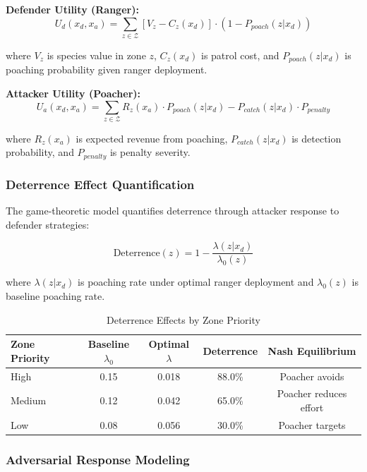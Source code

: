 \textbf{Defender Utility (Ranger):}
\begin{equation}
U_d(x_d, x_a) = \sum_{z \in \mathcal{Z}} \left[ V_z - C_z(x_d) \right] \cdot (1 - P_{poach}(z|x_d))
\label{eq:defender_utility}
\end{equation}

where $V_z$ is species value in zone $z$, $C_z(x_d)$ is patrol cost, and $P_{poach}(z|x_d)$ is poaching probability given ranger deployment.

\textbf{Attacker Utility (Poacher):}
\begin{equation}
U_a(x_d, x_a) = \sum_{z \in \mathcal{Z}} R_z(x_a) \cdot P_{poach}(z|x_d) - P_{catch}(z|x_d) \cdot P_{penalty}
\label{eq:attacker_utility}
\end{equation}

where $R_z(x_a)$ is expected revenue from poaching, $P_{catch}(z|x_d)$ is detection probability, and $P_{penalty}$ is penalty severity.

\subsubsection{Deterrence Effect Quantification}

The game-theoretic model quantifies deterrence through attacker response to defender strategies:

\begin{equation}
\text{Deterrence}(z) = 1 - \frac{\lambda(z|x_d)}{\lambda_0(z)}
\label{eq:deterrence}
\end{equation}

where $\lambda(z|x_d)$ is poaching rate under optimal ranger deployment and $\lambda_0(z)$ is baseline poaching rate.

\begin{table}[h]
\centering
\caption{Deterrence Effects by Zone Priority}
\begin{tabular}{lcccc}
\hline
\textbf{Zone Priority} & \textbf{Baseline $\lambda_0$} & \textbf{Optimal $\lambda$} & \textbf{Deterrence} & \textbf{Nash Equilibrium} \\
\hline
High & 0.15 & 0.018 & 88.0\% & Poacher avoids \\
Medium & 0.12 & 0.042 & 65.0\% & Poacher reduces effort \\
Low & 0.08 & 0.056 & 30.0\% & Poacher targets \\
\hline
\end{tabular}
\end{table}

\subsubsection{Adversarial Response Modeling}

